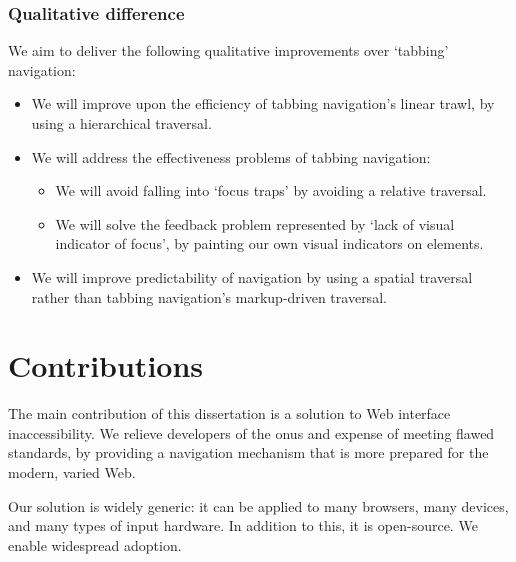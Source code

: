 \documentclass[11pt,openright,a4paper]{report}
\begin{document}
\subsubsection{Qualitative difference}
\label{sec:qualitative_promises}
We aim to deliver the following qualitative improvements over `tabbing' navigation:
\begin{itemize}
\item We will improve upon the efficiency of tabbing navigation's linear trawl, by using a hierarchical traversal.

\item We will address the effectiveness problems of tabbing navigation:
\begin{itemize}
\item We will avoid falling into `focus traps' by avoiding a relative traversal.
\item We will solve the feedback problem represented by `lack of visual indicator of focus', by painting our own visual indicators on elements.
\end{itemize}

\item We will improve predictability of navigation by using a spatial traversal rather than tabbing navigation's markup-driven traversal.
\end{itemize}

\section{Contributions}
The main contribution of this dissertation is a solution to Web interface inaccessibility. We relieve developers of the onus and expense of meeting flawed standards, by providing a navigation mechanism that is more prepared for the modern, varied Web.

Our solution is widely generic: it can be applied to many browsers, many devices, and many types of input hardware. In addition to this, it is open-source. We enable widespread adoption.


\end{document}
